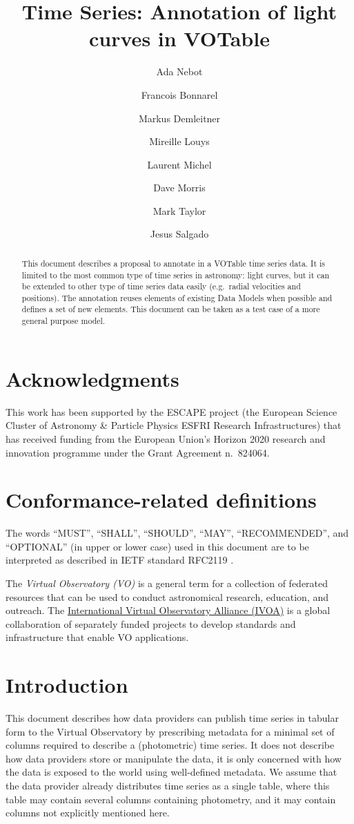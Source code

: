 \documentclass[11pt,a4paper]{ivoa} 
\title{Time Series: Annotation of light curves in VOTable}
\author[http://www.ivoa.net/twiki/bin/view/IVOA/AdaNebot]{Ada Nebot}
\author[http://www.ivoa.net/twiki/bin/view/IVOA/FrancoisBonnarel]{Francois
  Bonnarel}
\author[http://www.ivoa.net/twiki/bin/view/IVOA/MarkusDemleitner]{Markus
  Demleitner}
\author[http://www.ivoa.net/twiki/bin/view/IVOA/MireilleLouys]{Mireille
  Louys}
\author[http://www.ivoa.net/twiki/bin/view/IVOA/LaurentMichel]{Laurent
  Michel}
\author[http://www.ivoa.net/twiki/bin/view/IVOA/DaveMorris]{Dave
  Morris}
\author[http://www.ivoa.net/twiki/bin/view/IVOA/MarkTaylor]{Mark Taylor}
\author[http://www.ivoa.net/twiki/bin/view/IVOA/JesusSalgado]{Jesus
  Salgado}
\begin{document}
\begin{abstract}
  This document describes a proposal to annotate in a VOTable time
  series data. It is limited to the most common type of time series in
  astronomy: light curves, but it can be extended to other type of
  time series data easily (e.g.\ radial velocities and positions). The
  annotation reuses elements of existing Data Models when possible and
  defines a set of new elements. This document can be taken as a test
  case of a more general purpose model.
\end{abstract}

\section*{Acknowledgments}
This work has been supported by the ESCAPE project (the European
Science Cluster of Astronomy \& Particle Physics ESFRI Research
Infrastructures) that has received funding from the European Union's
Horizon 2020 research and innovation programme under the Grant
Agreement n.\ 824064.

\section*{Conformance-related definitions}

The words ``MUST'', ``SHALL'', ``SHOULD'', ``MAY'', ``RECOMMENDED'',
and ``OPTIONAL'' (in upper or lower case) used in this document are to
be interpreted as described in IETF standard RFC2119
\citep{std:RFC2119}.

The \emph{Virtual Observatory (VO)} is a general term for a collection
of federated resources that can be used to conduct astronomical
research, education, and outreach.  The
\href{http://www.ivoa.net}{International Virtual Observatory Alliance
  (IVOA)} is a global collaboration of separately funded projects to
develop standards and infrastructure that enable VO applications.


\section{Introduction}
This document describes how data providers can publish time series in
tabular form to the Virtual Observatory by prescribing metadata for a
minimal set of columns required to describe a (photometric) time
series.  It does not describe how data providers store or manipulate
the data, it is only concerned with how the data is exposed to the
world using well-defined metadata. We assume that the data provider
already distributes time series as a single table, where this table
may contain several columns containing photometry, and it may contain
columns not explicitly mentioned here.
\end{document}
